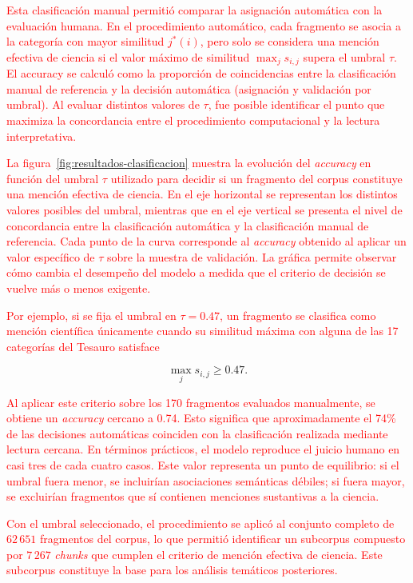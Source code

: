 \documentclass[11pt,a4paper]{article}
\begin{document}
\textcolor{red}{Esta clasificación manual permitió comparar la asignación automática con la evaluación humana. En el procedimiento automático, cada fragmento se asocia a la categoría con mayor similitud $j^*(i)$, pero solo se considera una mención efectiva de ciencia si el valor máximo de similitud $\max_j s_{i,j}$ supera el umbral $\tau$. El accuracy se calculó como la proporción de coincidencias entre la clasificación manual de referencia y la decisión automática (asignación y validación por umbral). Al evaluar distintos valores de $\tau$, fue posible identificar el punto que maximiza la concordancia entre el procedimiento computacional y la lectura interpretativa.}

\textcolor{red}{La figura~\ref{fig:resultados-clasificacion} muestra la evolución del \emph{accuracy} en función del umbral $\tau$ utilizado para decidir si un fragmento del corpus constituye una mención efectiva de ciencia. En el eje horizontal se representan los distintos valores posibles del umbral, mientras que en el eje vertical se presenta el nivel de concordancia entre la clasificación automática y la clasificación manual de referencia. Cada punto de la curva corresponde al \emph{accuracy} obtenido al aplicar un valor específico de $\tau$ sobre la muestra de validación. La gráfica permite observar cómo cambia el desempeño del modelo a medida que el criterio de decisión se vuelve más o menos exigente.}

\textcolor{red}{Por ejemplo, si se fija el umbral en $\tau = 0.47$, un fragmento se clasifica como mención científica únicamente cuando su similitud máxima con alguna de las 17 categorías del Tesauro satisface}

\[
\max_j s_{i,j} \ge 0.47.
\]

\textcolor{red}{Al aplicar este criterio sobre los 170 fragmentos evaluados manualmente, se obtiene un \emph{accuracy} cercano a 0.74. Esto significa que aproximadamente el 74\% de las decisiones automáticas coinciden con la clasificación realizada mediante lectura cercana. En términos prácticos, el modelo reproduce el juicio humano en casi tres de cada cuatro casos. Este valor representa un punto de equilibrio: si el umbral fuera menor, se incluirían asociaciones semánticas débiles; si fuera mayor, se excluirían fragmentos que sí contienen menciones sustantivas a la ciencia.} 
	
\textcolor{red}{Con el umbral seleccionado, el procedimiento se aplicó al conjunto completo de $62\,651$ fragmentos del corpus, lo que permitió identificar un subcorpus compuesto por $7\,267$ \emph{chunks} que cumplen el criterio de mención efectiva de ciencia. Este subcorpus constituye la base para los análisis temáticos posteriores.
}
\end{document}
